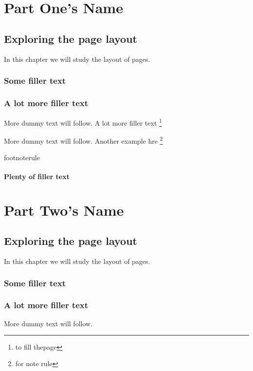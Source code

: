 \documentclass[a4paper,12pt]{book}
\begin{document}
\tableofcontents


\part{Part One's Name}


\chapter[Chap1Name]{Exploring the page layout}
\begin{flushright} In this chapter we will study the layout of pages. \end{flushright}
\section[SectionName]{Some filler text}
\blindtext
\section[section name]{A lot more filler text}
More dummy text will follow. A lot more filler text \protect\footnote{to fill thepage}

More dummy text will follow. Another example hre \protect\footnote{for note rule}

footnoterule

\subsection[subsection name]{Plenty of filler text}
\blindtext[10]

\part{Part Two's Name}

\chapter[Chap2Name]{Exploring the page layout}
\begin{flushright} In this chapter we will study the layout of pages. \end{flushright}
\section[SectionName]{Some filler text}
\blindtext
\section[section name]{A lot more filler text}
More dummy text will follow.
\end{document}
